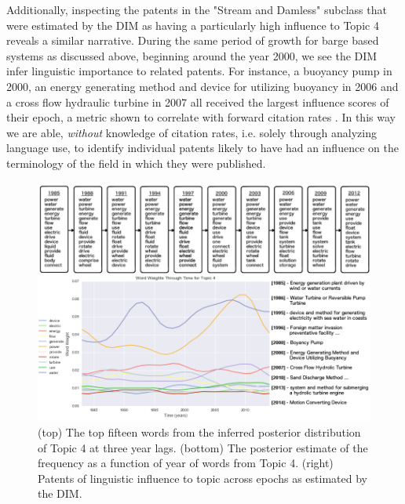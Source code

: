 Additionally, inspecting the patents in the "Stream and Damless" subclass that were estimated by the DIM as having a particularly high influence to Topic 4 reveals a similar narrative. During the same period of growth for barge based systems as discussed above, beginning around the year 2000, we see the DIM infer linguistic importance to related patents. For instance, a buoyancy pump in 2000, an energy generating method and device for utilizing buoyancy in 2006 and a cross flow hydraulic turbine in 2007 all received the largest influence scores of their epoch, a metric shown to correlate with forward citation rates \parencite{icml2010_GerrishB10}. In this way we are able, \emph{without} knowledge of citation rates, i.e. solely through analyzing language use, to identify individual patents likely to have had an influence on the terminology of the field in which they were published. 



\begin{figure}[!htb]
\centering
\includegraphics[width=130mm,scale=0.45]{Figures/Topic4}
\decoRule
\caption[wwttTopic4]{(top) The top fifteen words from the inferred posterior distribution of Topic 4 at three year lags. (bottom) The posterior estimate of the frequency as a function of year of words from Topic 4. (right) Patents of linguistic influence to topic across epochs as estimated by the DIM.}
\label{fig:wwttTopic4}
\end{figure}

